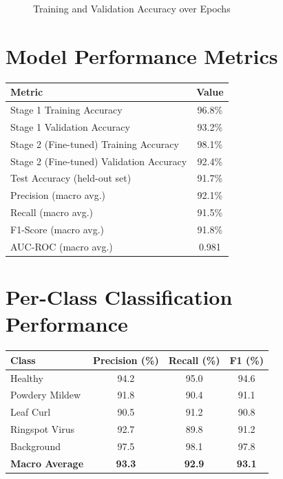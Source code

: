 \documentclass[12pt,a4paper]{report}
\begin{document}
\begin{figure}[h!]
\centering
\caption{Training and Validation Accuracy over Epochs}
\label{fig:accuracy_curve}
\end{figure}

\section{Model Performance Metrics}

\begin{center}
\begin{tabular}{|l|c|}
\hline
\textbf{Metric} & \textbf{Value} \\
\hline
Stage 1 Training Accuracy & 96.8\% \\
Stage 1 Validation Accuracy & 93.2\% \\
Stage 2 (Fine-tuned) Training Accuracy & 98.1\% \\
Stage 2 (Fine-tuned) Validation Accuracy & 92.4\% \\
Test Accuracy (held-out set) & 91.7\% \\
Precision (macro avg.) & 92.1\% \\
Recall (macro avg.) & 91.5\% \\
F1-Score (macro avg.) & 91.8\% \\
AUC-ROC (macro avg.) & 0.981 \\
\hline
\end{tabular}
\end{center}

\section{Per-Class Classification Performance}

\begin{center}
\begin{tabular}{|l|c|c|c|}
\hline
\textbf{Class} & \textbf{Precision (\%)} & \textbf{Recall (\%)} & \textbf{F1 (\%)} \\
\hline
Healthy & 94.2 & 95.0 & 94.6 \\
Powdery Mildew & 91.8 & 90.4 & 91.1 \\
Leaf Curl & 90.5 & 91.2 & 90.8 \\
Ringspot Virus & 92.7 & 89.8 & 91.2 \\
Background & 97.5 & 98.1 & 97.8 \\
\hline
\textbf{Macro Average} & \textbf{93.3} & \textbf{92.9} & \textbf{93.1} \\
\hline
\end{tabular}
\end{center}
\end{document}
